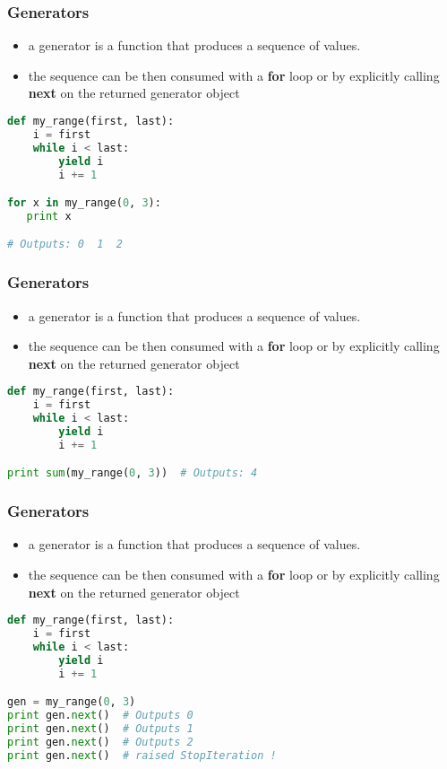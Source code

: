 \documentclass{beamer}
\begin{document}
\begin{frame}[fragile]
\frametitle{Generators}
\begin{itemize}
  \item a generator is a function that produces a sequence of values.
  \item the sequence can be then consumed with a {\bf for} loop or by explicitly
    calling {\bf next} on the returned generator object
\end{itemize}
\vspace{5 mm}
\pause
\begin{lstlisting}[language=python]
def my_range(first, last):
    i = first
    while i < last:
        yield i
        i += 1

for x in my_range(0, 3):
   print x

# Outputs: 0  1  2
\end{lstlisting}
\end{frame}

\begin{frame}[fragile]
\frametitle{Generators}
\begin{itemize}
  \item a generator is a function that produces a sequence of values.
  \item the sequence can be then consumed with a {\bf for} loop or by explicitly
    calling {\bf next} on the returned generator object
\end{itemize}
\vspace{5 mm}
\begin{lstlisting}[language=python]
def my_range(first, last):
    i = first
    while i < last:
        yield i
        i += 1

print sum(my_range(0, 3))  # Outputs: 4
\end{lstlisting}
\end{frame}

\begin{frame}[fragile]
\frametitle{Generators}
\begin{itemize}
  \item a generator is a function that produces a sequence of values.
  \item the sequence can be then consumed with a {\bf for} loop or by explicitly
    calling {\bf next} on the returned generator object
\end{itemize}
\vspace{5 mm}
\begin{lstlisting}[language=python]
def my_range(first, last):
    i = first
    while i < last:
        yield i
        i += 1

gen = my_range(0, 3)
print gen.next()  # Outputs 0
print gen.next()  # Outputs 1
print gen.next()  # Outputs 2
print gen.next()  # raised StopIteration !
\end{lstlisting}
\end{frame}
\end{document}
